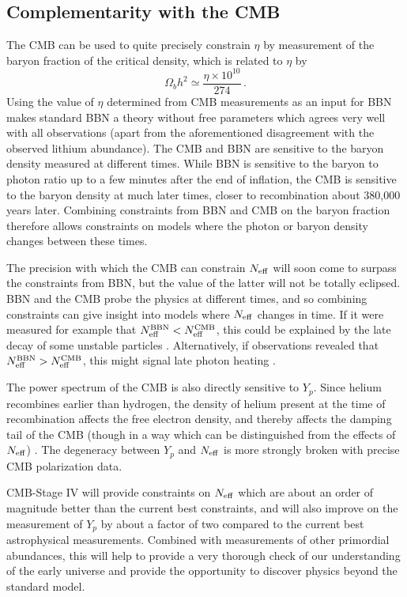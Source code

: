 \subsection{Complementarity with the CMB}\label{Complementarity}
The CMB can be used to quite precisely constrain $\eta$ by measurement of the baryon fraction of the critical density, which is related to $\eta$ by
\begin{equation}
	\Omega_b h^2 \simeq \frac{\eta\times10^{10}}{274} \, .
\end{equation}
Using the value of $\eta$ determined from CMB measurements as an input for BBN makes standard BBN a theory without free parameters which agrees very well with all observations (apart from the aforementioned disagreement with the observed lithium abundance).  The CMB and BBN are sensitive to the baryon density measured at different times.  While BBN is sensitive to the baryon to photon ratio up to a few minutes after the end of inflation, the CMB is sensitive to the baryon density at much later times, closer to recombination about 380,000 years later.  Combining constraints from BBN and CMB on the baryon fraction therefore allows constraints on models where the photon or baryon density changes between these times.

The precision with which the CMB can constrain $N_{\rm eff}$ will soon come to surpass the constraints from BBN, but the value of the latter will not be totally eclipsed.  BBN and the CMB probe the physics at different times, and so combining constraints can give insight into models where $N_{\rm eff}$ changes in time.  If it were measured for example that $N_{\rm eff}^{\mathrm{BBN}}<N_{\rm eff}^{\mathrm{CMB}}$, this could be explained by the late decay of some unstable particles \cite{Fischler:2010xz,Menestrina:2011mz,Hooper:2011aj}.  Alternatively, if observations revealed that $N_{\rm eff}^{\mathrm{BBN}}>N_{\rm eff}^{\mathrm{CMB}}$, this might signal late photon heating \cite{Cadamuro:2010cz,Millea:2015qra}.

The power spectrum of the CMB is also directly sensitive to $Y_p$.  Since helium recombines earlier than hydrogen, the density of helium present at the time of recombination affects the free electron density, and thereby affects the damping tail of the CMB (though in a way which can be distinguished from the effects of $N_{\rm eff}$) \cite{Bashinsky:2003tk,Hou:2011ec,Follin:2015hya,Baumann:2015rya}.  The degeneracy between $Y_p$ and $N_{\rm eff}$ is more strongly broken with precise CMB polarization data.

CMB-Stage IV will provide constraints on $N_{\rm eff}$ which are about an order of magnitude better than the current best constraints, and will also improve on the measurement of $Y_p$ by about a factor of two compared to the current best astrophysical measurements.  Combined with measurements of other primordial abundances, this will help to provide a very thorough check of our understanding of the early universe and provide the opportunity to discover physics beyond the standard model.






